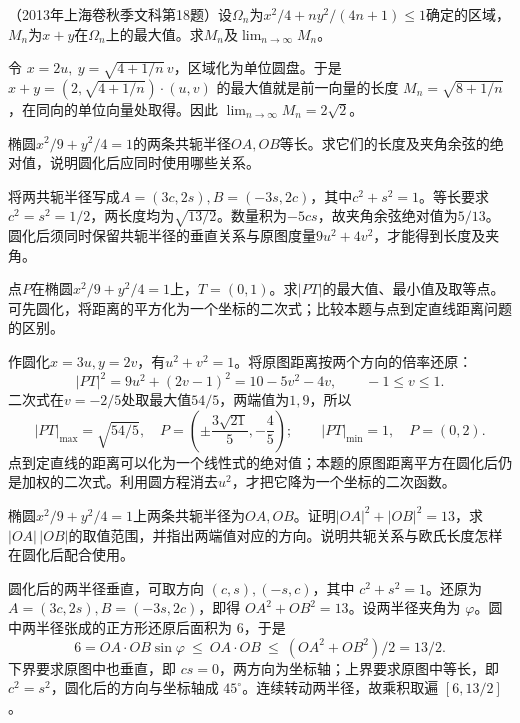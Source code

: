 （2013年上海卷秋季文科第18题）设\(\Omega_n\)为\(x^2/4+ny^2/(4n+1)\le1\)确定的区域，\(M_n\)为\(x+y\)在\(\Omega_n\)上的最大值。求\(M_n\)及\(\lim_{n\to\infty}M_n\)。
\par
\solutionanswer
令 \(x=2u,\ y=\sqrt{4+1/n}\,v\)，区域化为单位圆盘。于是 \(x+y=(2,\sqrt{4+1/n})\cdot(u,v)\) 的最大值就是前一向量的长度 \(M_n=\sqrt{8+1/n}\)，在同向的单位向量处取得。因此 \(\lim_{n\to\infty}M_n=2\sqrt2\)。


椭圆\(x^2/9+y^2/4=1\)的两条共轭半径\(OA,OB\)等长。求它们的长度及夹角余弦的绝对值，说明圆化后应同时使用哪些关系。
\par
\solutionanswer
将两共轭半径写成\(A=(3c,2s),B=(-3s,2c)\)，其中\(c^2+s^2=1\)。等长要求\(c^2=s^2=1/2\)，两长度均为\(\sqrt{13/2}\)。数量积为\(-5cs\)，故夹角余弦绝对值为\(5/13\)。圆化后须同时保留共轭半径的垂直关系与原图度量\(9u^2+4v^2\)，才能得到长度及夹角。


点\(P\)在椭圆\(x^2/9+y^2/4=1\)上，\(T=(0,1)\)。求\(|PT|\)的最大值、最小值及取等点。可先圆化，将距离的平方化为一个坐标的二次式；比较本题与点到定直线距离问题的区别。
\par
\solutionanswer
作圆化\(x=3u,y=2v\)，有\(u^2+v^2=1\)。将原图距离按两个方向的倍率还原：
\[
 |PT|^2=9u^2+(2v-1)^2=10-5v^2-4v,\qquad -1\le v\le1.
\]
二次式在\(v=-2/5\)处取最大值\(54/5\)，两端值为\(1,9\)，所以
\[
 |PT|_{\max}=\sqrt{54/5},\quad P=\left(\pm\frac{3\sqrt{21}}5,-\frac45\right);
 \qquad |PT|_{\min}=1,\quad P=(0,2).
\]
点到定直线的距离可以化为一个线性式的绝对值；本题的原图距离平方在圆化后仍是加权的二次式。利用圆方程消去\(u^2\)，才把它降为一个坐标的二次函数。


椭圆\(x^2/9+y^2/4=1\)上两条共轭半径为\(OA,OB\)。证明\(|OA|^2+|OB|^2=13\)，求\(|OA|\,|OB|\)的取值范围，并指出两端值对应的方向。说明共轭关系与欧氏长度怎样在圆化后配合使用。
\par
\solutionanswer
圆化后的两半径垂直，可取方向 \((c,s),(-s,c)\)，其中 \(c^2+s^2=1\)。还原为 \(A=(3c,2s), B=(-3s,2c)\)，即得 \(OA^2+OB^2=13\)。设两半径夹角为 \(\varphi\)。圆中两半径张成的正方形还原后面积为 \(6\)，于是
\[
  6=OA\cdot OB\sin\varphi\ \le\ OA\cdot OB\ \le\ (OA^2+OB^2)/2=13/2 .
\]
下界要求原图中也垂直，即 \(cs=0\)，两方向为坐标轴；上界要求原图中等长，即 \(c^2=s^2\)，圆化后的方向与坐标轴成 \(45^\circ\)。连续转动两半径，故乘积取遍 \([6,13/2]\)。


